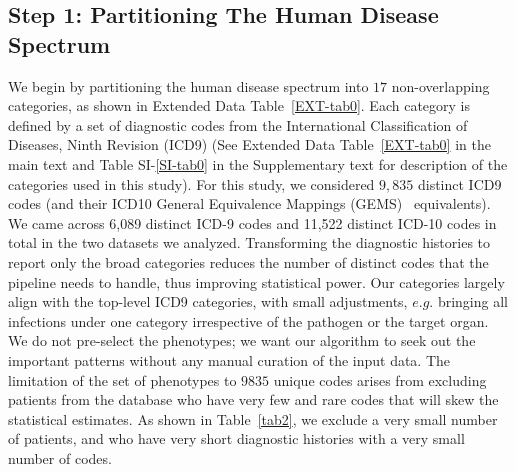 \documentclass[3p,super,numbers,sort&compress,preprint,10pt]{elsarticle}
\begin{document}
\subsection*{Step 1: Partitioning The Human Disease Spectrum} We begin by partitioning the human disease spectrum into  $17$ non-overlapping  categories,  as shown in Extended Data Table~\ref{EXT-tab0}. Each category is defined by a set of diagnostic codes from the International Classification of Diseases, Ninth Revision (ICD9) (See Extended Data Table~\ref{EXT-tab0} in the main text  and Table SI-\ref{SI-tab0} in the Supplementary text for description of  the categories used in this study).
For this study, we considered $9,835$ distinct ICD9 codes (and their ICD10 General Equivalence Mappings (GEMS)~\cite{GEMS} equivalents). We came across 6,089 distinct ICD-9 codes and 11,522 distinct ICD-10 codes in total in the two datasets we analyzed. Transforming the diagnostic histories to report only the broad categories   reduces the number of distinct codes that the pipeline needs to handle, thus improving statistical  power.  %
%
Our categories largely align with the top-level ICD9 categories, with small 
adjustments, $e.g.$ bringing all infections under one category irrespective of the pathogen or the target organ.
We do not pre-select the phenotypes; we want our algorithm to seek out the important patterns without any manual curation of the input data. The limitation of the set of phenotypes to $9835$ unique codes arises from excluding patients from the database who have very few and rare codes that will skew the statistical estimates. As shown in Table~\ref{tab2}, we exclude a very small number of patients, and who have  very short diagnostic histories with a very small number of codes.
\end{document}
